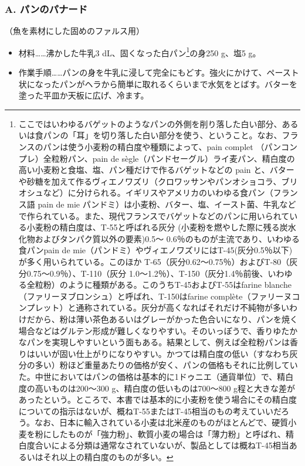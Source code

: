 \begin{recette}

\hypertarget{panade-a}{%
\subsubsection{A. パンのパナード}\label{panade-a}}



（魚を素材にした固めのファルス用）

\begin{itemize}
\item
  材料\ldots{}\ldots{}沸かした牛乳3 dL、固くなった白パン\footnote{ここではいわゆるバゲットのようなパンの外側を削り落した白い部分、あるいは食パンの「耳」を切り落した白い部分を使う、ということ。なお、フランスのパンは使う小麦粉の精白度や種類によって、pain
    complet （パンコンプレ）全粒粉パン、pain de
    sègle（パンドセーグル）ライ麦パン、精白度の高い小麦粉と食塩、塩、パン種だけで作るバゲットなどの
    pain
    と、バターや砂糖を加えて作るヴィエノワズリ（クロワッサンやパンオショコラ、ブリオシュなど）に分けられる。イギリスやアメリカのいわゆる食パン（フランス語
    pain de mie
    パンドミ）は小麦粉、バター、塩、イースト菌、牛乳などで作られている。また、現代フランスでバゲットなどのパンに用いられている小麦粉の精白度は、T-55と呼ばれる灰分
    (小麦粉を燃やした際に残る炭水化物およびタンパク質以外の要素)0.5〜
    0.6％のものが主流であり、いわゆる食パンpain de
    mie（パンドミ）やヴィエノワズリにはT-45(灰分0.5％以下)が多く用いられている。このほか
    T-65（灰分0.62〜0.75％）およびT-80（灰分0.75〜0.9％）、T-110（灰分
    1.0〜1.2％）、T-150（灰分1.4％前後、いわゆる全粒粉）のように種類がある。このうちT-45およびT-55はfarine
    blanche（ファリーヌブロンシュ）と呼ばれ、T-150はfarine
    complète（ファリーヌコンプレット）と通称されている。灰分が高くなればそれだけ不純物が多いわけだから、粉は薄い茶色あるいはグレーがかった色合いになり、パンを焼く場合などはグルテン形成が難しくなりやすい。そのいっぽうで、香りゆたかなパンを実現しやすいという面もある。結果として、例えば全粒粉パンは香りはいいが固い仕上がりになりやすい。かつては精白度の低い（すなわち灰分の多い）粉ほど重量あたりの価格が安く、パンの価格もそれに比例していた。中世においてはパンの価格は基本的に1ドゥニエ（通貨単位）で、精白度の高いものは200〜300
    g、精白度の低いものは700〜800
    g程と大きな差があったという。ところで、本書では基本的に小麦粉を使う場合にその精白度についての指示はないが、概ねT-55またはT-45相当のもの考えていいだろう。なお、日本に輸入されている小麦は北米産のものがほとんどで、硬質小麦を粉にしたものが「強力粉」、軟質小麦の場合は「薄力粉」と呼ばれ、精白度合いによる分類は通常なされていないが、製品としては概ねT-45相当あるいはそれ以上の精白度のものが多い。}の身250
  g、塩5 g。
\item
  作業手順\ldots{}\ldots{}パンの身を牛乳に浸して完全にもどす。強火にかけて、ペースト状になったパンがヘラから簡単に取れるくらいまで水気をとばす。バターを塗った平皿か天板に広げ、冷ます。
\end{itemize}


\end{recette}
